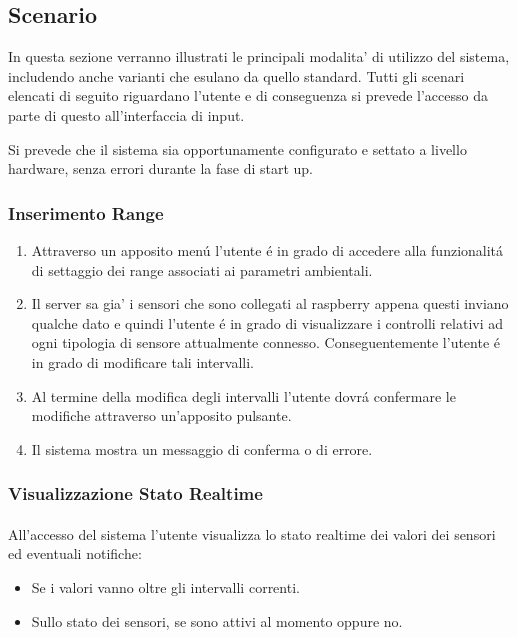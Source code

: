 \subsection{Scenario}

In questa sezione verranno illustrati le principali modalita' di utilizzo del sistema, includendo anche varianti che esulano da quello standard. Tutti gli scenari elencati di seguito riguardano l'utente e di conseguenza si prevede l'accesso da parte di questo all'interfaccia di input.

Si prevede che il sistema sia opportunamente configurato e settato a livello hardware, senza errori durante la fase di start up.

\subsubsection{Inserimento Range}

\begin{enumerate}
  \item Attraverso un apposito men\'u l'utente \'e in grado di accedere alla funzionalit\'a di settaggio dei range associati ai parametri ambientali.
  \item Il server sa gia' i sensori che sono collegati al raspberry appena questi inviano qualche dato e quindi l'utente \'e in grado di visualizzare i controlli relativi ad ogni tipologia di sensore attualmente connesso. Conseguentemente l'utente \'e in grado di modificare tali intervalli.
  \item Al termine della modifica degli intervalli l'utente dovr\'a confermare le modifiche attraverso un'apposito pulsante.
  \item Il sistema mostra un messaggio di conferma o di errore.
\end{enumerate}

\subsubsection{Visualizzazione Stato Realtime}

\paragraph{} All'accesso del sistema l'utente visualizza lo stato realtime dei valori dei sensori ed eventuali notifiche:
\begin{itemize}
  \item Se i valori vanno oltre gli intervalli correnti.
  \item Sullo stato dei sensori, se sono attivi al momento oppure no.
\end{itemize}

